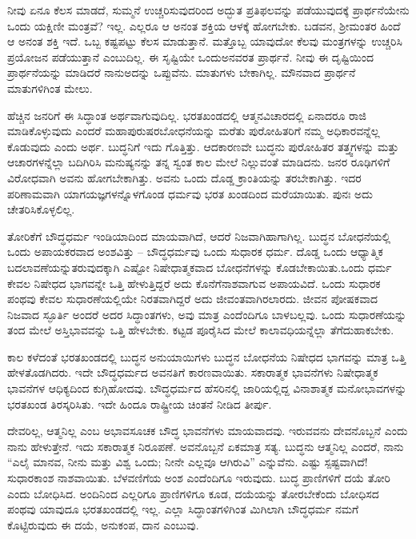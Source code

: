 ನೀವು ಏನೂ ಕೆಲಸ ಮಾಡದೆ, ಸುಮ್ಮನೆ ಉಚ್ಚರಿಸುವುದರಿಂದ ಅದ್ಭುತ ಪ್ರತಿಫಲವನ್ನು ಪಡೆಯುವುದಕ್ಕೆ ಪ್ರಾರ್ಥನೆಯೇನು ಒಂದು ಯಕ್ಷಿಣೀ ಮಂತ್ರವೆ? ಇಲ್ಲ. ಎಲ್ಲರೂ ಆ ಅನಂತ ಶಕ್ತಿಯ ಆಳಕ್ಕೆ ಹೋಗಬೇಕು. ಬಡವನ, ಶ‍್ರೀಮಂತರ ಹಿಂದೆ ಆ ಅನಂತ ಶಕ್ತಿ ಇದೆ. ಒಬ್ಬ ಕಷ್ಟಪಟ್ಟು ಕೆಲಸ ಮಾಡುತ್ತಾನೆ. ಮತ್ತೊಬ್ಬ ಯಾವುದೋ ಕೆಲವು ಮಂತ್ರಗಳನ್ನು ಉಚ್ಚರಿಸಿ ಪ್ರಯೋಜನ ಪಡೆಯುತ್ತಾನೆ ಎಂಬುದಿಲ್ಲ. ಈ ಸೃಷ್ಟಿಯೇ ಒಂದು\break ಅನವರತ ಪ್ರಾರ್ಥನೆ. ನೀವು ಈ ದೃಷ್ಟಿಯಿಂದ ಪ್ರಾರ್ಥನೆಯನ್ನು ಮಾಡಿದರೆ ನಾನು\break ಅದನ್ನು ಒಪ್ಪುವೆನು. ಮಾತುಗಳು ಬೇಕಾಗಿಲ್ಲ. ಮೌನವಾದ ಪ್ರಾರ್ಥನೆ ಮಾತುಗಳಿಗಿಂತ ಮೇಲು.

ಹೆಚ್ಚಿನ ಜನರಿಗೆ ಈ ಸಿದ್ಧಾಂತ ಅರ್ಥವಾಗುವುದಿಲ್ಲ. ಭರತಖಂಡದಲ್ಲಿ ಆತ್ಮನ\break ವಿಚಾರದಲ್ಲಿ ಏನಾದರೂ ರಾಜಿ ಮಾಡಿಕೊಳ್ಳುವುದು ಎಂದರೆ ಮಹಾಪುರುಷರ\break ಬೋಧನೆಯನ್ನು ಮರೆತು ಪುರೋಹಿತರಿಗೆ ನಮ್ಮ ಅಧಿಕಾರವನ್ನೆಲ್ಲ ಕೊಡುವುದು ಎಂದು ಅರ್ಥ. ಬುದ್ಧನಿಗೆ ಇದು ಗೊತ್ತಿತ್ತು. ಆದಕಾರಣವೇ ಬುದ್ಧನು ಪುರೋಹಿತರ ತತ್ತ್ವಗಳನ್ನು ಮತ್ತು ಆಚಾರಗಳನ್ನೆಲ್ಲಾ ಬದಿಗಿರಿಸಿ ಮನುಷ್ಯನನ್ನು ತನ್ನ ಸ್ವಂತ ಕಾಲ ಮೇಲೆ ನಿಲ್ಲುವಂತೆ ಮಾಡಿದನು. ಜನರ ರೂಢಿಗಳಿಗೆ ವಿರೋಧವಾಗಿ ಅವನು ಹೋಗಬೇಕಾಗಿತ್ತು. ಅವನು ಒಂದು ದೊಡ್ಡ ಕ್ರಾಂತಿಯನ್ನು ತರಬೇಕಾಗಿತ್ತು. ಇದರ ಪರಿಣಾಮವಾಗಿ ಯಾಗ\break ಯಜ್ಞಗಳನ್ನೊಳಗೊಂಡ ಧರ್ಮವು ಭರತ ಖಂಡದಿಂದ ಮರೆಯಾಯಿತು. ಪುನಃ ಅದು ಚೇತರಿಸಿಕೊಳ್ಳಲಿಲ್ಲ.

ತೋರಿಕೆಗೆ ಬೌದ್ಧಧರ್ಮ ಇಂಡಿಯಾದಿಂದ ಮಾಯವಾಗಿದೆ, ಆದರೆ ನಿಜವಾಗಿ\break ಹಾಗಾಗಿಲ್ಲ. ಬುದ್ಧನ ಬೋಧನೆಯಲ್ಲಿ ಒಂದು ಅಪಾಯಕರವಾದ ಅಂಶವಿತ್ತು – ಬೌದ್ಧಧರ್ಮವು ಒಂದು ಸುಧಾರಕ ಧರ್ಮ. ದೊಡ್ಡ ಒಂದು ಆಧ್ಯಾತ್ಮಿಕ ಬದಲಾವಣೆಯನ್ನು\break ತರುವುದಕ್ಕಾಗಿ ಎಷ್ಟೋ ನಿಷೇಧಾತ್ಮಕವಾದ ಬೋಧನೆಗಳನ್ನು ಕೊಡಬೇಕಾಯಿತು.\break ಒಂದು ಧರ್ಮ ಕೇವಲ ನಿಷೇಧದ ಭಾಗವನ್ನೇ ಒತ್ತಿ ಹೇಳುತ್ತಿದ್ದರೆ ಅದು ಕೊನೆಗೆ\break ನಾಶವಾಗುವ ಅಪಾಯವಿದೆ. ಒಂದು ಸುಧಾರಕ ಪಂಥವು ಕೇವಲ ಸುಧಾರಣೆಯಲ್ಲಿಯೇ ನಿರತವಾಗಿದ್ದರೆ ಅದು ಜೀವಂತವಾಗಿರಲಾರದು. ಜೀವನ ಪೋಷಕವಾದ ನಿಜವಾದ ಸ್ಫೂರ್ತಿ ಅಂದರೆ ಅದರ ಸಿದ್ಧಾಂತಗಳು, ಅವು ಮಾತ್ರ ಎಂದೆಂದಿಗೂ ಬಾಳಬಲ್ಲವು. ಒಂದು ಸುಧಾರಣೆಯನ್ನು ತಂದ ಮೇಲೆ ಅಸ್ತಿಭಾವವನ್ನು ಒತ್ತಿ ಹೇಳಬೇಕು. ಕಟ್ಟಡ ಪೂರೈಸಿದ ಮೇಲೆ ಕಾಲಾವಧಿಯನ್ನೆಲ್ಲಾ ತೆಗೆದುಹಾಕಬೇಕು.

ಕಾಲ ಕಳೆದಂತೆ ಭರತಖಂಡದಲ್ಲಿ ಬುದ್ಧನ ಅನುಯಾಯಿಗಳು ಬುದ್ಧನ ಬೋಧನೆಯ ನಿಷೇಧದ ಭಾಗವನ್ನು ಮಾತ್ರ ಒತ್ತಿ ಹೇಳತೊಡಗಿದರು. ಇದೇ ಬೌದ್ಧಧರ್ಮದ ಅವನತಿಗೆ ಕಾರಣವಾಯಿತು. ಸಕಾರಾತ್ಮಕ ಭಾವನೆಗಳು ನಿಷೇಧಾತ್ಮಕ ಭಾವನೆಗಳ ಆಧಿಕ್ಯದಿಂದ ಕುಗ್ಗಿಹೋದವು. ಬೌದ್ಧಧರ್ಮದ ಹೆಸರಿನಲ್ಲಿ ಜಾರಿಯಲ್ಲಿದ್ದ ವಿನಾಶಾತ್ಮಕ ಮನೋಭಾವಗಳನ್ನು ಭರತಖಂಡ ತಿರಸ್ಕರಿಸಿತು. ಇದೇ ಹಿಂದೂ ರಾಷ್ಟ್ರೀಯ ಚಿಂತನೆ ನೀಡಿದ ತೀರ್ಪು.

ದೇವರಿಲ್ಲ, ಆತ್ಮನಿಲ್ಲ ಎಂಬ ಅಭಾವಸೂಚಕ ಬೌದ್ಧ ಭಾವನೆಗಳು ಮಾಯವಾದವು. ಇರುವವನು ದೇವನೊಬ್ಬನೆ ಎಂದು ನಾನು ಹೇಳುತ್ತೇನೆ. ಇದು ಸಕಾರಾತ್ಮಕ ನಿರೂಪಣೆ. ಅವನೊಬ್ಬನೆ ಏಕಮಾತ್ರ ಸತ್ಯ. ಬುದ್ಧನು ಆತ್ಮನಿಲ್ಲ ಎಂದರೆ, ನಾನು “ಎಲೈ ಮಾನವ, ನೀನು ಮತ್ತು ವಿಶ್ವ ಒಂದು; ನೀನೇ ಎಲ್ಲವೂ ಆಗಿರುವಿ” ಎನ್ನುವೆನು. ಎಷ್ಟು ಸ್ಪಷ್ಟವಾಗಿದೆ! ಸುಧಾರಕಾಂಶ ನಾಶವಾಯಿತು. ಬೆಳವಣಿಗೆಯ ಅಂಶ ಎಂದೆಂದಿಗೂ ಇರುವುದು. ಬುದ್ಧ ಪ್ರಾಣಿಗಳಿಗೆ ದಯೆ ತೋರಿ ಎಂದು ಬೋಧಿಸಿದ. ಅಂದಿನಿಂದ ಎಲ್ಲರಿಗೂ ಪ್ರಾಣಿಗಳಿಗೂ ಕೂಡ, ದಯೆಯನ್ನು ತೋರಬೇಕೆಂದು ಬೋಧಿಸದ ಪಂಥವು ಯಾವುದೂ ಭರತಖಂಡದಲ್ಲಿ ಇಲ್ಲ. ಎಲ್ಲಾ ಸಿದ್ಧಾಂತಗಳಿಗಿಂತ ಮಿಗಿಲಾಗಿ ಬೌದ್ಧಧರ್ಮ ನಮಗೆ ಕೊಟ್ಟಿರುವುದು ಈ ದಯೆ, ಅನುಕಂಪ, ದಾನ ಎಂಬುವು.

